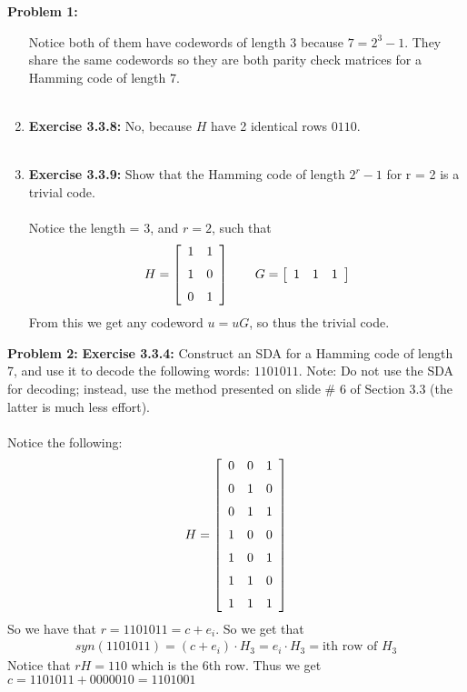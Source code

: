 \documentclass[11pt]{article}
\newcommand{\spacer}{\noalign{\medskip}}
\newenvironment{problem}[1]{\textbf{Problem #1: }}{\newpage}
\begin{document}
\begin{problem}{1}
\begin{enumerate}[label = (\alph*)]
			Notice both of them have codewords of length 3 because $7 = 2^3 - 1$.  They share the same codewords so they are both parity check matrices for a Hamming code of length 7. 
			\\ \\
			\item \textbf{Exercise 3.3.8:} No, because $H$ have 2 identical rows $0110$. 
			\\ \\
			\item \textbf{Exercise 3.3.9:} Show that the Hamming code of length $2^r -1$ for r = 2 is a trivial code.
			\\ \\
			Notice the length = 3, and $r = 2$, such that
			\[H = \left[\begin{array}{cc}
				1 & 1 \\
				\spacer 1 & 0 \\
				\spacer 0 & 1
			\end{array}\right] \qquad G = \left[\begin{array}{ccc}
				1 & 1 & 1	
			\end{array}\right]\]
			From this we get any codeword $u = uG$, so thus the trivial code.
		\end{enumerate}
	\end{problem}

	\begin{problem}{2}
		\textbf{Exercise 3.3.4:} Construct an SDA for a Hamming code of length 7, and use it to decode the following words: $1101011$.
		 Note: Do not use the SDA for decoding; instead, use the method presented on slide \# 6 of Section 3.3 (the latter is much less effort).
		 \\ \\
		 Notice the following:
		 \[H = \left[\begin{array}{ccc}
		 	0 & 0 & 1 \\
		 	\spacer 0 & 1 & 0 \\
		 	\spacer 0 & 1 & 1 \\
		 	\spacer 1 & 0 & 0 \\
		 	\spacer 1 & 0 & 1 \\
		 	\spacer 1 & 1 & 0 \\
		 	\spacer 1 & 1 & 1 \\
		 \end{array}\right] \]
	 	So we have that $r = 1101011 = c + e_i$. So we get that
	 	\begin{align*}
	 		syn(1101011) = (c + e_i)\cdot H_3 = e_i \cdot H_3 = \text{ith row of $H_3$}
	 	\end{align*}
 		Notice that $rH = 110$ which is the 6th row.  Thus we get $c = 1101011 + 0000010 = 1101001$
	\end{problem}
\end{document}
